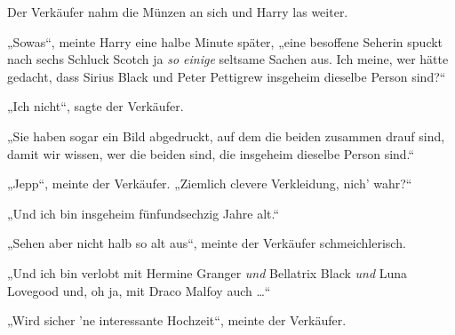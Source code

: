 Der Verkäufer nahm die Münzen an sich und Harry las weiter.

„Sowas“, meinte Harry eine halbe Minute später, „eine besoffene Seherin spuckt nach sechs Schluck Scotch ja \emph{so einige} seltsame Sachen aus. Ich meine, wer hätte gedacht, dass Sirius Black und Peter Pettigrew insgeheim dieselbe Person sind?“

„Ich nicht“, sagte der Verkäufer.

„Sie haben sogar ein Bild abgedruckt, auf dem die beiden zusammen drauf sind, damit wir wissen, wer die beiden sind, die insgeheim dieselbe Person sind.“

„Jepp“, meinte der Verkäufer.
„Ziemlich clevere Verkleidung, nich’ wahr?“

„Und ich bin insgeheim fünfundsechzig Jahre alt.“

„Sehen aber nicht halb so alt aus“, meinte der Verkäufer schmeichlerisch.

„Und ich bin verlobt mit Hermine Granger \emph{und} Bellatrix Black \emph{und} Luna Lovegood und, oh ja, mit Draco Malfoy auch …“

„Wird sicher ’ne interessante Hochzeit“, meinte der Verkäufer.

